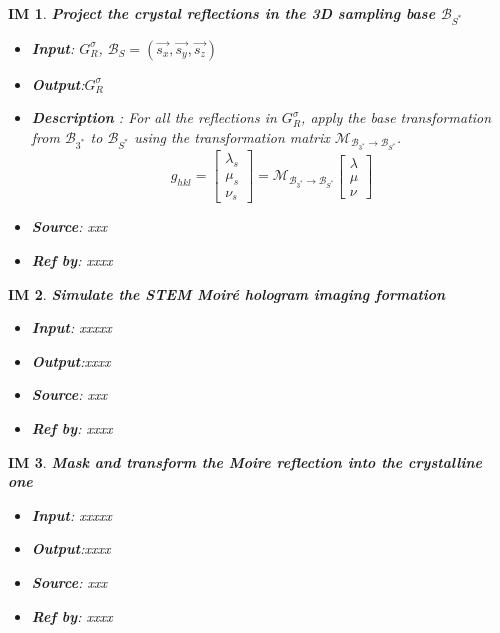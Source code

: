 \documentclass[12pt]{article}
\newtheorem{IM}{IM}
\begin{document}
\begin{IM}
\label{IM_2}
\noindent\colorbox{shadecolorIM}{\normalfont \textbf{Project the crystal reflections in the 3D sampling base $\mathcal{B}_{{S}^{*}}$}}
\normalfont
\begin{itemize}
\item \textbf{Input}: $G^{\sigma}_{R}$,  $\mathcal{B}_{S}=(\vec{s_x}, \vec{s_y}, \vec{s_z})$
\item \textbf{Output}:$G^{\sigma}_{R}$
\item \textbf{Description} : For all the reflections in $G^{\sigma}_{R}$, apply the base transformation from $\mathcal{B}_{{3}^{*}}$ to $\mathcal{B}_{{S}^{*}}$ using the transformation matrix $\mathcal{M}_{\mathcal{B}_{{3}^{*}}\rightarrow \mathcal{B}_{{S}^{*}}}$. 
\begin{equation}
g_{hkl} = \begin{bmatrix}
\lambda_s \\
\mu_s \\
\nu_s 
\end{bmatrix} =  \mathcal{M}_{\mathcal{B}_{{3}^{*}}\rightarrow \mathcal{B}_{{S}^{*}}} 
\begin{bmatrix}
\lambda \\
\mu \\
\nu 
\end{bmatrix}
\end{equation}
\item \textbf{Source}: xxx
\item \textbf{Ref by}: xxxx
\end{itemize}
\end{IM}

\begin{IM}
\label{IM_3}
\noindent\colorbox{shadecolorIM}{\normalfont \textbf{Simulate the STEM Moir{\'e} hologram imaging formation}}
\normalfont
\begin{itemize}
\item \textbf{Input}: xxxxx
\item \textbf{Output}:xxxx

\item \textbf{Source}: xxx
\item \textbf{Ref by}: xxxx
\end{itemize}
\end{IM}

\begin{IM}
\label{IM_4}
\noindent\colorbox{shadecolorIM}{\normalfont \textbf{Mask and transform the Moire reflection into the crystalline one}}
\normalfont
\begin{itemize}
\item \textbf{Input}: xxxxx
\item \textbf{Output}:xxxx

\item \textbf{Source}: xxx
\item \textbf{Ref by}: xxxx
\end{itemize}
\end{IM}
\end{document}
